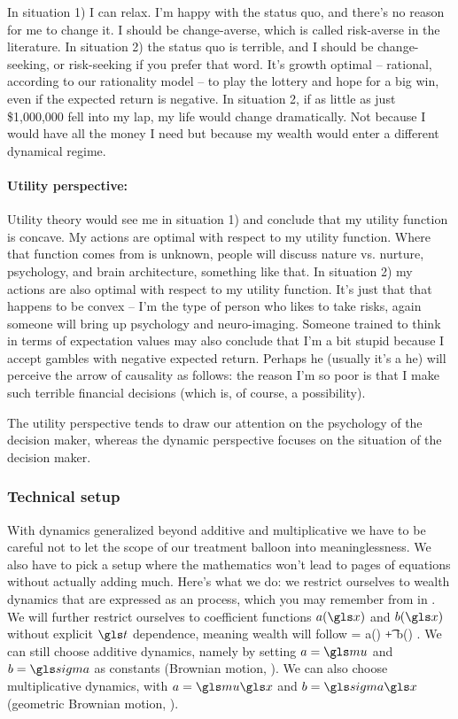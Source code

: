 In situation 1) I can relax. I'm happy with the status quo, and there's no reason for me to change it. 
I should be change-averse, which is called risk-averse in the literature. In situation 2) the 
status quo is terrible, and I should be change-seeking, or risk-seeking if you prefer that word.
It's growth optimal -- rational, according to our rationality model -- to play the lottery and hope for a big win, even if the expected return is negative. In situation 2, if as 
little as just \$1,000,000 fell into my lap, my life would change dramatically. Not because I would 
have all the money I need but because my wealth would enter a different dynamical regime. 

\paragraph{\bf Utility perspective:}
Utility theory would see me in situation 1) and conclude that my utility function 
is concave. My actions are optimal with respect to my utility function. Where that function 
comes from is unknown, people will discuss nature vs. nurture, psychology, and brain architecture, 
something like that. In situation 2) my actions are also optimal 
with respect to my utility function. It's just that that happens to be convex -- I'm the type of person 
who likes to take risks, again someone will bring up psychology and neuro-imaging. Someone 
trained to think in terms of expectation values may also conclude that I'm a bit stupid because I 
accept gambles with negative expected return. Perhaps he (usually it's a he) will perceive the 
arrow of causality as follows: the reason I'm so poor is that I make such terrible 
financial decisions (which is, of course, a possibility).

The utility perspective tends to draw our attention on the psychology of the decision maker, 
whereas the dynamic perspective focuses on the situation of the decision maker. 

\subsubsection{Technical setup}
With dynamics generalized beyond additive and multiplicative we have to be careful not to 
let the scope of our treatment balloon into meaninglessness. We also have to pick a setup 
where the mathematics won't lead to pages of equations without actually adding much.
Here's what we do: we restrict ourselves to 
wealth dynamics that are expressed as an \Ito process, which you may remember from 
 in . We will further restrict ourselves to coefficient functions  
$a(\x)$ and $b(\x)$ without explicit $\t$ dependence, meaning wealth will follow 
\be
\gd\x = a(\x) \gd\t + b(\x) \gd\gW.
\ee
We can still choose additive dynamics, namely by setting $a=\gmu$ and $b=\gsigma$ as constants 
(Brownian motion, ). We can also choose multiplicative dynamics, with $a=\gmu\x$ and $b=\gsigma\x$ 
(geometric Brownian motion, ).

